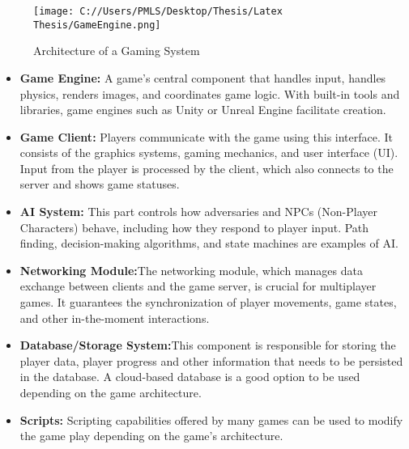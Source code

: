 \begin{figure}[H]
	\centering
	\texttt{[image: C://Users/PMLS/Desktop/Thesis/Latex Thesis/GameEngine.png]}
	\caption{Architecture of a Gaming System}
	\label{fig:Architecture of Gaming System}
\end{figure}

\begin{itemize}
	\item\textbf{Game Engine:} A game's central component that handles input, handles physics, renders images, and coordinates game logic. With built-in tools and libraries, game engines such as Unity or Unreal Engine facilitate creation.
	\item \textbf{Game Client:} Players communicate with the game using this interface. It consists of the graphics systems, gaming mechanics, and user interface (UI). Input from the player is processed by the client, which also connects to the server and shows game statuses.
	\item \textbf{AI System:} This part controls how adversaries and NPCs (Non-Player Characters) behave, including how they respond to player input. Path finding, decision-making algorithms, and state machines are examples of AI.
	\item \textbf{Networking Module:}The networking module, which manages data exchange between clients and the game server, is crucial for multiplayer games. It guarantees the synchronization of player movements, game states, and other in-the-moment interactions.
	\item \textbf{Database/Storage System:}This component is responsible for storing the player data, player progress and other information that needs to be persisted in the database. A cloud-based database is a good option to be used depending on the game architecture.
	\item \textbf{Scripts:} Scripting capabilities offered by many games can be used to modify the game play depending on the game's architecture.
\end{itemize}

